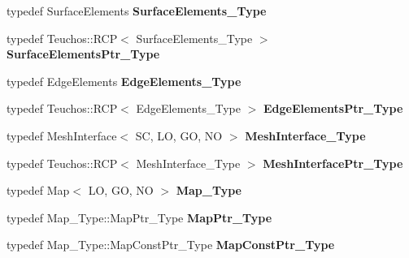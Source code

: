 \begin{DoxyCompactItemize}
\item 
\mbox{\label{classFEDD_1_1RefinementFactory_a240b95cf08c5e92bbe1a03555dc6f519}} 
typedef Surface\+Elements {\bfseries Surface\+Elements\+\_\+\+Type}
\item 
\mbox{\label{classFEDD_1_1RefinementFactory_a0f79f50fb173e3acc3167279a7f1345a}} 
typedef Teuchos\+::\+R\+CP$<$ Surface\+Elements\+\_\+\+Type $>$ {\bfseries Surface\+Elements\+Ptr\+\_\+\+Type}
\item 
\mbox{\label{classFEDD_1_1RefinementFactory_a4ecf8fe210fc6060b24b37d1955d9a41}} 
typedef Edge\+Elements {\bfseries Edge\+Elements\+\_\+\+Type}
\item 
\mbox{\label{classFEDD_1_1RefinementFactory_a8d86e0d3a5fbf66548b2919590a80342}} 
typedef Teuchos\+::\+R\+CP$<$ Edge\+Elements\+\_\+\+Type $>$ {\bfseries Edge\+Elements\+Ptr\+\_\+\+Type}
\item 
\mbox{\label{classFEDD_1_1RefinementFactory_a00302cf977be058f72385dd6687344cb}} 
typedef Mesh\+Interface$<$ SC, LO, GO, NO $>$ {\bfseries Mesh\+Interface\+\_\+\+Type}
\item 
\mbox{\label{classFEDD_1_1RefinementFactory_ab247d74ce40f3b9ca72334ed61052cf6}} 
typedef Teuchos\+::\+R\+CP$<$ Mesh\+Interface\+\_\+\+Type $>$ {\bfseries Mesh\+Interface\+Ptr\+\_\+\+Type}
\item 
\mbox{\label{classFEDD_1_1RefinementFactory_a3c51bc6fe3a5ab13cd4e4fb44bff78c9}} 
typedef Map$<$ LO, GO, NO $>$ {\bfseries Map\+\_\+\+Type}
\item 
\mbox{\label{classFEDD_1_1RefinementFactory_a56971c3f5c10a56a42c694676f52d3c1}} 
typedef Map\+\_\+\+Type\+::\+Map\+Ptr\+\_\+\+Type {\bfseries Map\+Ptr\+\_\+\+Type}
\item 
\mbox{\label{classFEDD_1_1RefinementFactory_acc2c8e7ecacdf0992be92861366de188}} 
typedef Map\+\_\+\+Type\+::\+Map\+Const\+Ptr\+\_\+\+Type {\bfseries Map\+Const\+Ptr\+\_\+\+Type}

\end{DoxyCompactItemize}
